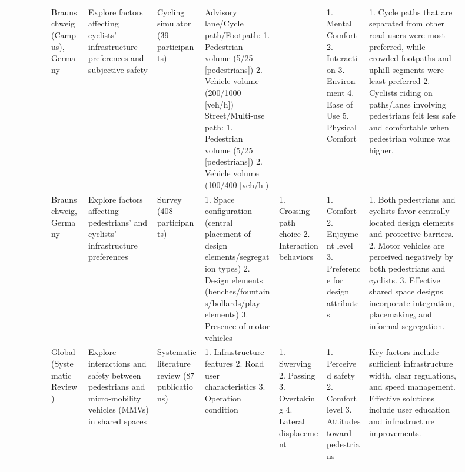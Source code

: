 {\begin{longtable}{@{}
    R{0.085\linewidth}
    R{0.075\linewidth}
    R{0.135\linewidth}
    R{0.095\linewidth}
    R{0.145\linewidth}
    R{0.095\linewidth}
    R{0.085\linewidth}
    R{0.185\linewidth}@{}}
  \citet*{berghoefer2023prefer}
    & Braun\-schweig (Campus), Germany
    & Explore factors affecting cyclists' infrastructure preferences and
      subjective safety
    & Cycling simulator (39 participants)
    & Advisory lane/Cycle path/Footpath:
      1. Pedestrian volume (5/25 [pedestrians])
      2. Vehicle volume (200/1000 [veh/h])
      Street/Multi-use path:
      1. Pedestrian volume (5/25 [pedestrians])
      2. Vehicle volume (100/400 [veh/h])
    &
    & 1. Mental Comfort
      2. Interaction
      3. Environment
      4. Ease of Use
      5. Physical Comfort
    & 1. Cycle paths that are separated from other road users were most
      preferred, while crowded footpaths and uphill segments were least
      preferred
      2. Cyclists riding on paths/lanes involving pedestrians felt less safe and
      comfortable when pedestrian volume was higher.\\
  \addlinespace[4pt]

  \citet{batista2023exploring}
    & Braun\-schweig, Germany
    & Explore factors affecting pedestrians' and cyclists' infrastructure
      preferences
    & Survey (408 participants)
    & 1. Space configuration (central placement of design
      elements/segregation types)
      2. Design elements (benches/fountains/bol\-lards/play elements)
      3. Presence of motor vehicles
    & 1. Crossing path choice
      2. Interaction behaviors
    & 1. Comfort
      2. Enjoyment level
      3. Preference for design attributes
    & 1. Both pedestrians and cyclists favor centrally located design elements
      and protective barriers.
      2. Motor vehicles are perceived negatively by both pedestrians and
      cyclists.
      3. Effective shared space designs incorporate integration, placemaking,
      and informal segregation.\\
  \addlinespace[4pt]

  \citet{zhang2023space}
    & Global (Systematic Review)
    & Explore interactions and safety between pedestrians and micro-mobility
      vehicles (MMVs) in shared spaces
    & Systematic literature review (87 publications)
    & 1. Infrastructure features
      2. Road user characteristics
      3. Operation condition
    & 1. Swerving
      2. Passing
      3. Overtaking
      4. Lateral displacement
    & 1. Perceived safety
      2. Comfort level
      3. Attitudes toward pedestrians
    & Key factors include sufficient infrastructure width, clear regulations,
      and speed management. Effective solutions include user education and
      infrastructure improvements.\\
  \addlinespace[4pt]


\end{longtable}}

